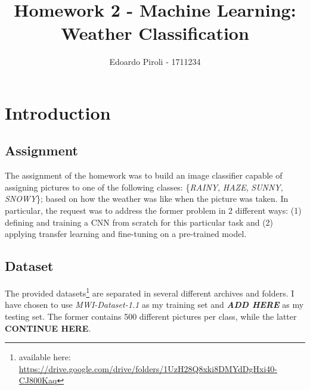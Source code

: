 \documentclass[a4paper]{article}
\title{Homework 2 - Machine Learning: Weather Classification}
\author{Edoardo Piroli - 1711234}
\begin{document}
\maketitle
\thispagestyle{empty}

\newpage
\tableofcontents
\thispagestyle{empty}
\newpage


\section{Introduction}
\subsection{Assignment}
The assignment of the homework was to build an image classifier capable of assigning pictures to one of the following classes: \{\textit{RAINY}, \textit{HAZE}, \textit{SUNNY}, \textit{SNOWY}\}; based on how the weather was like when the picture was taken. In particular, the request was to address the former problem in 2 different ways: (1) defining and training a CNN from scratch for this particular task and (2) applying transfer learning and fine-tuning on a pre-trained model.
\subsection{Dataset}
The provided datasets\footnote{available here: \href{https://drive.google.com/drive/folders/1UzH28Q8xki8_DMYdDgHxi40-CJ800Kaq}{https://drive.google.com/drive/folders/1UzH28Q8xki8\textunderscore DMYdDgHxi40-CJ800Kaq}} are separated in several different archives and folders. I have chosen to use \textit{MWI-Dataset-1.1} as my training set and \textbf{\textit{ADD HERE}} as my testing set. The former contains 500 different pictures per class, while the latter \textbf{CONTINUE HERE}.
\end{document}
